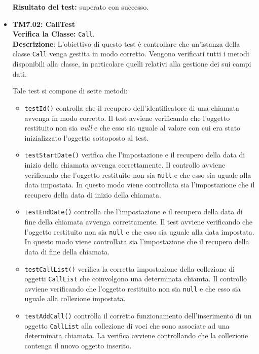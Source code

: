 \begin{itemize}
\begin{itemize}
 
\end{itemize}
\textbf{Risultato del test:} superato con successo.

\item \textbf{TM7.02: CallTest}\\
\textbf{Verifica la Classe:} \texttt{Call}.\\
\textbf{Descrizione}: L'obiettivo di questo test è controllare che un'istanza della classe  \texttt{Call} venga gestita in modo corretto. Vengono verificati tutti i metodi disponibili alla classe, in particolare quelli relativi alla gestione dei sui campi dati.

Tale test si compone di sette metodi:
\begin{itemize}

\item \texttt{testId()} controlla che il recupero dell'identificatore di una chiamata avvenga in modo corretto. 
Il test avviene verificando che l'oggetto restituito non sia \textit{null} e che esso sia uguale al valore con cui era stato inizializzato l'oggetto sottoposto al test.

\item \texttt{testStartDate()} verifica che l'impostazione e il recupero della data di inizio della chiamata avvenga correttamente.
Il controllo avviene verificando che l'oggetto restituito non sia \texttt{null} e che esso sia uguale alla data impostata. In questo modo viene controllata sia l'impostazione che il recupero della data di inizio della chiamata.

\item \texttt{testEndDate()} controlla che l'impostazione e il recupero della data di fine della chiamata avvenga correttamente.
Il test avviene verificando che l'oggetto restituito non sia \texttt{null} e che esso sia uguale alla data impostata. In questo modo viene controllata sia l'impostazione che il recupero della data di fine della chiamata.

\item \texttt{testCallList()} verifica la corretta impostazione  della collezione di oggetti \texttt{CallList} che coinvolgono una determinata chiamta. 
Il controllo avviene verificando che l'oggetto restituito non sia \texttt{null} e che esso sia uguale alla collezione impostata.

\item \texttt{testAddCall()} controlla il corretto funzionamento dell'inserimento di un oggetto \texttt{CallList} alla collezione di voci che sono associate ad una determinata chiamata. La verifica avviene controllando che la collezione contenga il nuovo oggetto inserito.


\end{itemize}
\end{itemize}
